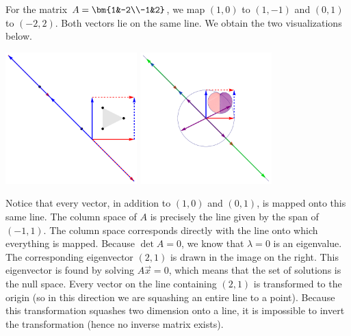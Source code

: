 \begin{example}
For the matrix 
$A=\bm{1&-2\\-1&2}$, we map $(1,0)$ to $(1,-1)$ and $(0,1)$ to $(-2,2)$. Both vectors lie on the same line.
We obtain the two visualizations below. 
\begin{center}
\includegraphics[height=2in]{Linear-Transformations/support/LTsingular2da}
\includegraphics[height=2in]{Linear-Transformations/support/LTsingular2db}
\end{center}
Notice that every vector, in addition to $(1,0)$ and $(0,1)$, is mapped onto this same line.  The column space of $A$ is precisely the line given by the span of $(-1,1)$. The column space corresponds directly with the line onto which everything is mapped. Because $\det A = 0$, we know that $\lambda=0$ is an eigenvalue. The corresponding eigenvector $(2,1)$ is drawn in the image on the right. This eigenvector is found by solving $A\vec x = 0$, which means that the set of solutions is the null space.  Every vector on the line containing $(2,1)$ is transformed to the origin (so in this direction we are squashing an entire line to a point).  Because this transformation squashes two dimension onto a line, it is impossible to invert the transformation (hence no inverse matrix exists).

\end{example}

